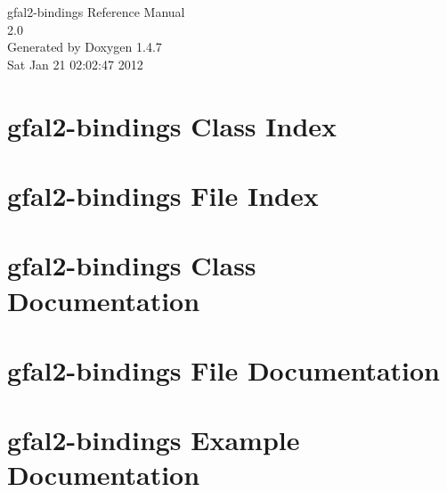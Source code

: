 \documentclass[a4paper]{book}
\begin{document}
\begin{titlepage}
\vspace*{7cm}
\begin{center}
{\Large gfal2-bindings Reference Manual\\[1ex]\large 2.0 }\\
\vspace*{1cm}
{\large Generated by Doxygen 1.4.7}\\
\vspace*{0.5cm}
{\small Sat Jan 21 02:02:47 2012}\\
\end{center}
\end{titlepage}
\clearemptydoublepage
{}
\tableofcontents
\clearemptydoublepage
{}
\chapter{gfal2-bindings Class Index}

\chapter{gfal2-bindings File Index}

\chapter{gfal2-bindings Class Documentation}

\chapter{gfal2-bindings File Documentation}

\chapter{gfal2-bindings Example Documentation}


\printindex
\end{document}
